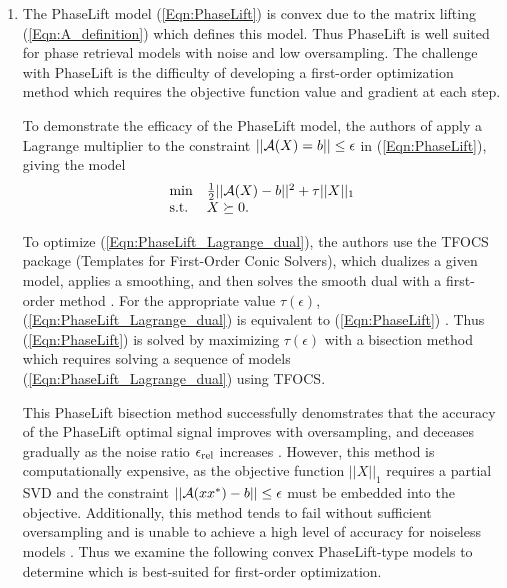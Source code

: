 \begin{enumerate}
\item

The PhaseLift model (\ref{Eqn:PhaseLift}) is convex due to the matrix lifting (\ref{Eqn:A_definition}) which defines this model.  Thus PhaseLift is well suited for phase retrieval models with noise and low oversampling.  The challenge with PhaseLift is the difficulty of developing a first-order optimization method which requires the objective function value and gradient at each step. 

To demonstrate the efficacy of the PhaseLift model, the authors of \cite{DBLP:journals/siamis/CandesESV13} apply a Lagrange multiplier to the constraint $||{\mathcal A}(X)=b|| \leq \epsilon$ in (\ref{Eqn:PhaseLift}), giving the model
\begin{equation}		\label{Eqn:PhaseLift_Lagrange_dual}
\begin{array}{ll}
	\min
		& \frac{1}{2}||{\mathcal A}(X) - b||^2 +\tau ||X||_1
			\\
	\textnormal{s.t.}
		&	X \succeq 0.
\end{array}
\end{equation}

To optimize (\ref{Eqn:PhaseLift_Lagrange_dual}), the authors use the TFOCS package (Templates for First-Order Conic Solvers), which dualizes a given model, applies a smoothing, and then solves the smooth dual with a first-order method \cite{becker2011templates}.  For the appropriate value $ \tau(\epsilon)$, (\ref{Eqn:PhaseLift_Lagrange_dual})  is equivalent to (\ref{Eqn:PhaseLift}) \cite[Section 28]{rockafellar1970convex}.  Thus (\ref{Eqn:PhaseLift}) is solved by maximizing $\tau(\epsilon)$ with a bisection method which requires solving a sequence of models (\ref{Eqn:PhaseLift_Lagrange_dual}) using TFOCS.


This PhaseLift bisection method successfully denomstrates that the accuracy of the PhaseLift optimal signal improves with oversampling, and deceases gradually as the noise ratio $\epsilon_\textnormal{rel}$ increases \cite[Section 7]{candes2013phaselift}.  However, this method is computationally expensive, as the objective function $||X||_1$ requires a partial SVD and the constraint $||{\mathcal A}(xx^*) - b|| \leq \epsilon$ must be embedded into the objective.  Additionally, this method tends to fail without sufficient oversampling and is unable to achieve a high level of accuracy for noiseless models \cite[Section 5, Table 1]{DBLP:journals/siamsc/FriedlanderM16}.   Thus we examine the following convex PhaseLift-type models to determine which is best-suited for first-order optimization.




\end{enumerate}
